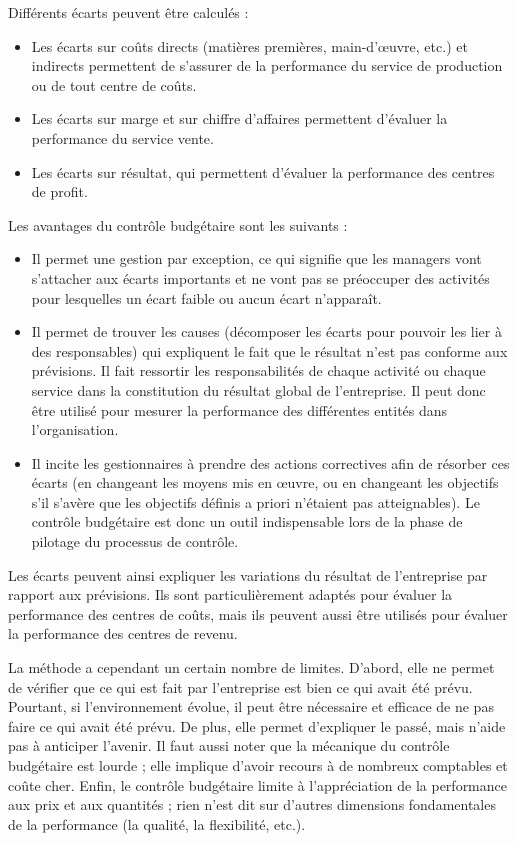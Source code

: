 \documentclass[oneside]{kaobook}
\begin{document}
Différents écarts peuvent être calculés :
\begin{itemize}
\item Les écarts sur coûts directs (matières premières, main-d’œuvre, etc.) et indirects permettent de s’assurer de la performance du service de production ou de tout centre de coûts.
\item Les écarts sur marge et sur chiffre d’affaires permettent d’évaluer la performance du service vente.
\item Les écarts sur résultat, qui permettent d’évaluer la performance des centres de profit.
\end{itemize}

\begin{kaobox}
Les avantages du contrôle budgétaire sont les suivants :
\begin{itemize}
\item Il permet une gestion par exception, ce qui signifie que les managers vont s’attacher aux écarts importants et ne vont pas se préoccuper des activités pour lesquelles un écart faible ou aucun écart n’apparaît.
\item Il permet de trouver les causes (décomposer les écarts pour pouvoir les lier à des responsables) qui expliquent le fait que le résultat n'est pas conforme aux prévisions. Il fait ressortir les responsabilités de chaque activité ou chaque service dans la constitution du résultat global de l’entreprise. Il peut donc être utilisé pour mesurer la performance des différentes entités dans l’organisation.
\item Il incite les gestionnaires à prendre des actions correctives afin de résorber ces écarts (en changeant les moyens mis en œuvre, ou en changeant les objectifs s’il s’avère que les objectifs définis a priori n’étaient pas atteignables). Le contrôle budgétaire est donc un outil indispensable lors de la phase de pilotage du processus de contrôle.
\end{itemize}
\end{kaobox}

Les écarts peuvent ainsi expliquer les variations du résultat de l’entreprise par rapport aux prévisions. Ils sont particulièrement adaptés pour évaluer la performance des centres de coûts, mais ils peuvent aussi être utilisés pour évaluer la performance des centres de revenu. 

La méthode a cependant un certain nombre de limites. D’abord, elle ne permet de vérifier que ce qui est fait par l’entreprise est bien ce qui avait été prévu. Pourtant, si l’environnement évolue, il peut être nécessaire et efficace de ne pas faire ce qui avait été prévu. De plus, elle permet d’expliquer le passé, mais n’aide pas à anticiper l’avenir. Il faut aussi noter que la mécanique du contrôle budgétaire est lourde ; elle implique d’avoir recours à de nombreux comptables et coûte cher. Enfin, le contrôle budgétaire limite à l’appréciation de la performance aux prix et aux quantités ; rien n’est dit sur d’autres dimensions fondamentales de la performance (la qualité, la flexibilité, etc.).
\end{document}
